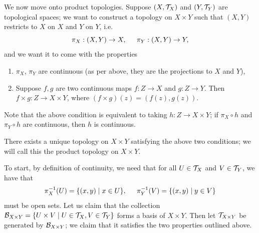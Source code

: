 \newpage
\noindent We now move onto product topologies. Suppose $(X, \mathcal T_X)$ and $(Y, \mathcal T_Y)$ are topological spaces; we want to construct a topology on $X \times Y$ such that $(X, Y)$ restricts to $X$ on $X$ and $Y$ on $Y$, i.e.
\[ \pi_X : (X, Y) \to X, \hspace{0.2in} \pi_Y : (X, Y) \to Y, \]
and we want it to come with the properties
\begin{enumerate}
    \item $\pi_X$, $\pi_Y$ are continuous (as per above, they are the projections to $X$ and $Y$),
    \item Suppose $f, g$ are two continuous maps $f : Z \to X$ and $g : Z \to Y$. Then $f \times g : Z \to X \times Y$, where $(f \times g)(z) = (f(z), g(z))$.
\end{enumerate}
\noindent Note that the above condition is equivalent to taking $h : Z \to X \times Y$; if $\pi_X \circ h$ and $\pi_Y \circ h$ are continuous, then $h$ is continuous.
\begin{simplethm}
    There exists a unique topology on $X \times Y$ satisfying the above two conditions; we will call this the product topology on $X \times Y$.
\end{simplethm}
\noindent To start, by definition of continuity, we need that for all $U \in \mathcal T_X$ and $V \in \mathcal T_Y$, we have that
\[ \pi_X^{-1}(U) = \{(x, y) \mid x \in U\}, \hspace{0.2in} \pi_Y^{-1}(V) = \{(x, y) \mid y \in V\} \]
must be open sets. Let us claim that the collection $\mathcal B_{X \times Y} = \{U \times V \mid U \in \mathcal T_X, V \in \mathcal T_Y\}$ forms a basis of $X \times Y$. Then let $\mathcal T_{X \times Y}$ be generated by $\mathcal B_{X \times Y}$; we claim that it satisfies the two properties outlined above.
